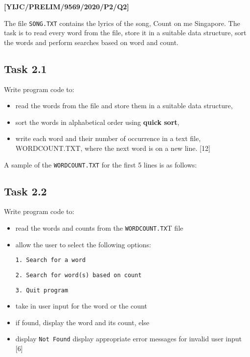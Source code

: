 \item \textbf{{[}YIJC/PRELIM/9569/2020/P2/Q2{]} }

The file \texttt{SONG.TXT} contains the lyrics of the song, Count
on me Singapore. The task is to read every word from the file, store
it in a suitable data structure, sort the words and perform searches
based on word and count.

\subsection*{Task 2.1}

Write program code to:
\begin{itemize}
\item read the words from the file and store them in a suitable data structure,
\item sort the words in alphabetical order using \textbf{quick sort}, 
\item write each word and their number of occurrence in a text file, WORDCOUNT.TXT,
where the next word is on a new line. {[}12{]}
\end{itemize}
A sample of the \texttt{WORDCOUNT.TXT} for the first 5 lines is as
follows:

\noindent %
\noindent{}

\subsection*{Task 2.2}

Write program code to:
\begin{itemize}
\item read the words and counts from the \texttt{WORDCOUNT.TX}T file 
\item allow the user to select the following options:

\noindent %
\noindent\begin{minipage}[t]{1\columnwidth}%
\texttt{1. Search for a word }

\texttt{2. Search for word(s) based on count}

\texttt{3. Quit program}%
\end{minipage}
\item take in user input for the word or the count 
\item if found, display the word and its count, else 
\item display \textquotedbl\texttt{Not Found}\textquotedbl{} display appropriate
error messages for invalid user input \hfill{}{[}6{]}
\end{itemize}

